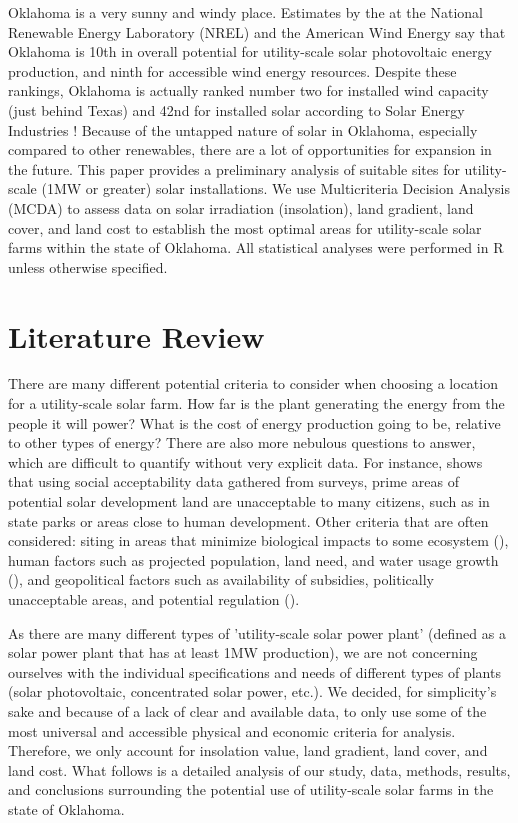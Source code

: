 \documentclass[12pt,english]{article}
\begin{document}
Oklahoma is a very sunny and windy place. Estimates by the \citet{lopez} at the National Renewable Energy Laboratory (NREL) and the American Wind Energy \citet{awea} say that Oklahoma is 10th in overall potential for utility-scale solar photovoltaic energy production, and ninth for accessible wind energy resources. Despite these rankings, Oklahoma is actually ranked number two for installed wind capacity (just behind Texas) and 42nd for installed solar according to Solar Energy Industries \citet{seia}! Because of the untapped nature of solar in Oklahoma, especially compared to other renewables, there are a lot of opportunities for expansion in the future. This paper provides a preliminary analysis of suitable sites for utility-scale (1MW or greater) solar installations. We use Multicriteria Decision Analysis (MCDA) to assess data on solar irradiation (insolation), land gradient, land cover, and land cost to establish the most optimal areas for utility-scale solar farms within the state of Oklahoma. All statistical analyses were performed in R unless otherwise specified. 

\pagebreak{}

\section{Literature Review}\label{sec:litreview}

There are many different potential criteria to consider when choosing a location for a utility-scale solar farm. How far is the plant generating the energy from the people it will power? What is the cost of energy production going to be, relative to other types of energy? There are also more nebulous questions to answer, which are difficult to quantify without very explicit data. For instance, \citet{brewer} shows that using social acceptability data gathered from surveys, prime areas of potential solar development land are unacceptable to many citizens, such as in state parks or areas close to human development. Other criteria that are often considered: siting in areas that minimize biological impacts to some ecosystem (\citet{stoms}), human factors such as projected population, land need, and water usage growth (\citet{omitaomu}), and geopolitical factors such as availability of subsidies, politically unacceptable areas, and potential regulation (\citet{tisza}).  

As there are many different types of 'utility-scale solar power plant' (defined as a solar power plant that has at least 1MW production), we are not concerning ourselves with the individual specifications and needs of different types of plants (solar photovoltaic, concentrated solar power, etc.). We decided, for simplicity's sake and because of a lack of clear and available data, to only use some of the most universal and accessible physical and economic criteria for analysis. Therefore, we only account for insolation value, land gradient, land cover, and land cost. What follows is a detailed analysis of our study, data, methods, results, and conclusions surrounding the potential use of utility-scale solar farms in the state of Oklahoma.  
\end{document}
